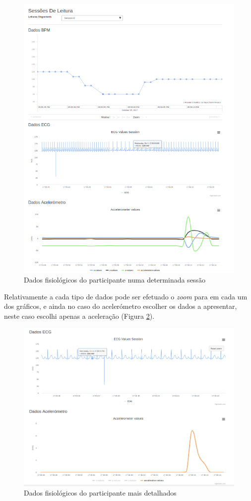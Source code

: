 \begin{figure}[H]
\centering
\includegraphics[width=1\textwidth]{imgs/dadosfisiologicos-web.png}
\caption[Dados fisiológicos do participante numa determinada sessão]{Dados fisiológicos do participante numa determinada sessão}
\label{f:leiturasdados}
\end{figure}
 Relativamente a cada tipo de dados pode ser efetuado o \textit{zoom} para em cada um dos gráficos, e ainda no caso do acelerómetro escolher os dados a apresentar, neste caso escolhi apenas a aceleração (Figura \ref{f:withzoom}).
 
 \begin{figure}[H]
\centering
\includegraphics[width=1\textwidth]{imgs/withzoom-choosen-web.png}
\caption[Dados fisiológicos do participante mais detalhados]{Dados fisiológicos do participante mais detalhados}
\label{f:withzoom}
 \end{figure}
